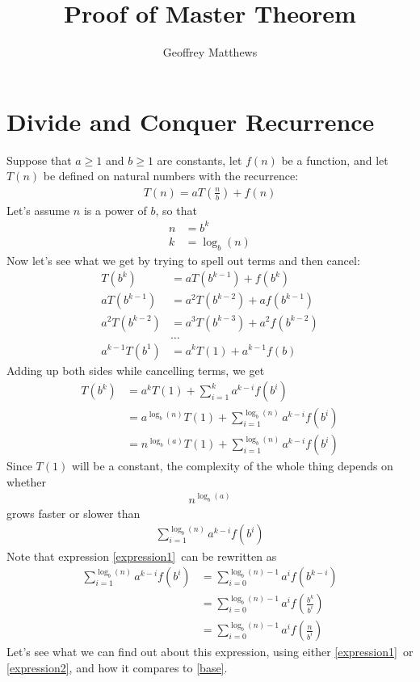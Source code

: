 \documentclass{article}
\title{Proof of Master Theorem}
\author{Geoffrey Matthews}
\begin{document}
\maketitle


\section{Divide and Conquer Recurrence}
Suppose that $a\geq 1$ and $b\geq 1$ are constants, let $f(n)$ be a
function, and let $T(n)$ be defined on natural numbers with
the recurrence:
\LARGE
\begin{align}
T(n) = aT\left(\frac{n}{b}\right) + f(n)
\end{align}
\normalsize
Let's assume $n$ is a power of $b$, so that
\LARGE
\begin{align}
n &= b^k\\
k&=\log_b(n)\end{align}
\normalsize
Now 
let's see what we get by trying to spell out terms and then cancel:
\LARGE
\begin{align}
T(b^k) &= aT(b^{k-1}) + f(b^k)\\
aT(b^{k-1})
&=
a^2T(b^{k-2}) + af(b^{k-1})
\\
a^2T(b^{k-2})
&=
a^3T(b^{k-3}) + a^2f(b^{k-2})
\\
&\ldots
\\
a^{k-1}T(b^{1})
&=
a^kT(1) + a^{k-1}f(b)
\end{align}
\normalsize
Adding up both sides while cancelling terms, we get
\LARGE
\begin{align}
T(b^k) &= a^kT(1) + \sum_{i=1}^{k} a^{k-i}f(b^{i})
\\
&=
a^{\log_b(n)}T(1) + \sum_{i=1}^{\log_b(n)} a^{k-i}f(b^{i})
\\
&=
n^{\log_b(a)}T(1) + \sum_{i=1}^{\log_b(n)} a^{k-i}f(b^{i}) \label{tcomplexity}
\end{align}
\normalsize
Since $T(1)$ will be a constant, the complexity of the whole thing
depends on whether 
\LARGE
\begin{align} n^{\log_b(a)}\label{base}\end{align}
\normalsize
grows faster or slower than
\LARGE
\begin{align}
  \sum_{i=1}^{\log_b(n)} a^{k-i}f(b^{i}) \label{expression1}
\end{align}
\normalsize
Note that expression \ref{expression1}\ can be rewritten as
\LARGE
\begin{align}
    \sum_{i=1}^{\log_b(n)} a^{k-i}f(b^{i})
  &=   \sum_{i=0}^{\log_b(n)-1} a^{i}f(b^{k-i}) \\
  &=   \sum_{i=0}^{\log_b(n)-1} a^{i}f\left(\frac{b^{k}}{b^{i}}\right)\\
  &=   \sum_{i=0}^{\log_b(n)-1} a^{i}f\left(\frac{n}{b^{i}}\right)
\label{expression2}
\end{align}
\normalsize
Let's see what we can find out about this expression, using either
\ref{expression1}\ or \ref{expression2}, and how it compares to
\ref{base}. 
\end{document}
